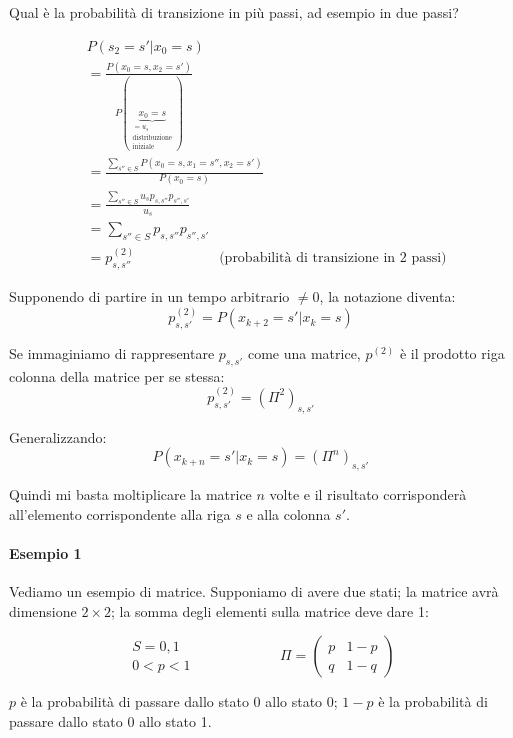\documentclass[a4paper,12pt]{book}
\begin{document}
Qual è la probabilità di transizione in più passi, ad esempio in due passi?

\begin{align*}
	& P(s_2 = s' | x_0 = s) \\
	& = \frac{P(x_0 = s, x_2 = s')}{P(\underbrace{x_0 = s}_{\substack{ = u_s \\ \text{distribuzione} \\ \text{iniziale}}}  )} \\
	& = \frac{\sum_{s'' \in S} P(x_0 = s, x_1 = s'', x_2 = s')}{P(x_0 = s)} \\
	& = \frac{\sum_{s'' \in S} u_s p_{s, s''} p_{s'', s'}}{u_s} \\
	& = \sum_{s'' \in S} p_{s,s''}p_{s'', s'} \\
	& = p_{s, s''}^{(2)} \qquad \qquad \qquad \text{(probabilità di transizione in 2 passi)}
\end{align*}

Supponendo di partire in un tempo arbitrario $\ne 0$, la notazione diventa:
 $$ p_{s,s'}^{(2)} = P(x_{k+2} = s' | x_k = s)$$

Se immaginiamo di rappresentare $ p_{s,s'} $ come una matrice, $ p^{(2)} $ è il prodotto riga colonna della matrice per se stessa:
$$ p_{s,s'}^{(2)} = (\Pi^2)_{s,s'}$$

Generalizzando:
$$ P(x_{k+n} = s' | x_k = s) = (\Pi^n)_{s,s'} $$

Quindi mi basta moltiplicare la matrice $ n $ volte e il risultato corrisponderà all'elemento corrispondente alla riga $ s $ e alla colonna $ s' $. 

\paragraph{Esempio 1} Vediamo un esempio di matrice. Supponiamo di avere due stati; la matrice avrà dimensione $ 2 \times 2 $; la somma degli elementi sulla matrice deve dare 1:

$$ 
	\begin{array}{c}
		S = {0, 1} \\
		0 < p < 1
	\end{array}
	\qquad \qquad \qquad \Pi = \left(\begin{array}{cc}
	 	p & 1-p \\
	 	q & 1-q
	\end{array}\right)
$$

$ p $ è la probabilità di passare dallo stato 0 allo stato 0; $ 1-p $ è la probabilità di passare dallo stato 0 allo stato 1.
\end{document}
